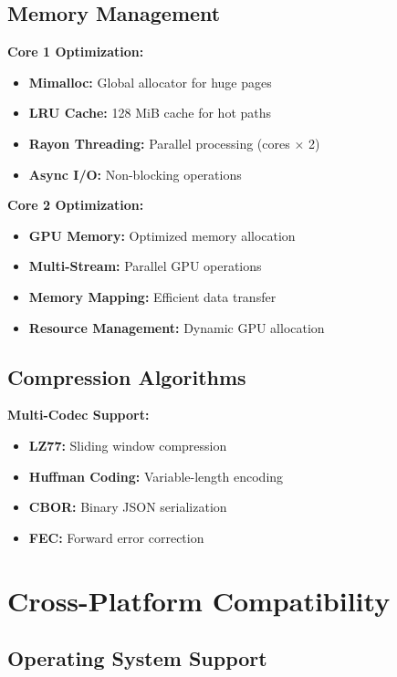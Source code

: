 \documentclass[12pt,a4paper]{article}
\begin{document}
\subsection{Memory Management}

\textbf{Core 1 Optimization:}
\begin{itemize}
    \item \textbf{Mimalloc:} Global allocator for huge pages
    \item \textbf{LRU Cache:} 128 MiB cache for hot paths
    \item \textbf{Rayon Threading:} Parallel processing (cores × 2)
    \item \textbf{Async I/O:} Non-blocking operations
\end{itemize}

\textbf{Core 2 Optimization:}
\begin{itemize}
    \item \textbf{GPU Memory:} Optimized memory allocation
    \item \textbf{Multi-Stream:} Parallel GPU operations
    \item \textbf{Memory Mapping:} Efficient data transfer
    \item \textbf{Resource Management:} Dynamic GPU allocation
\end{itemize}

\subsection{Compression Algorithms}

\textbf{Multi-Codec Support:}
\begin{itemize}
    \item \textbf{LZ77:} Sliding window compression
    \item \textbf{Huffman Coding:} Variable-length encoding
    \item \textbf{CBOR:} Binary JSON serialization
    \item \textbf{FEC:} Forward error correction
\end{itemize}

\section{Cross-Platform Compatibility}

\subsection{Operating System Support}
\end{document}
